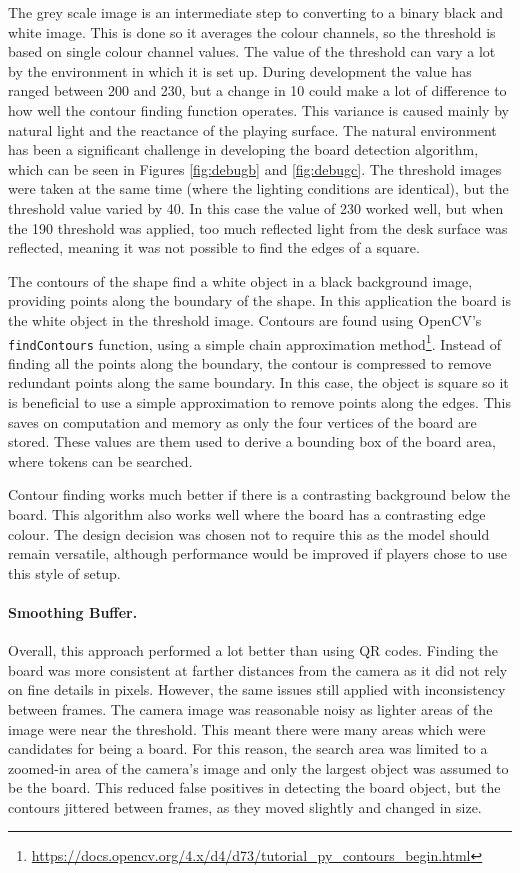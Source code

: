 \documentclass[12pt]{article}
\begin{document}
The grey scale image is an intermediate step to converting to a binary black and white image. 
This is done so it averages the colour channels, so the threshold is based on single colour channel values. 
The value of the threshold can vary a lot by the environment in which it is set up. 
During development the value has ranged between 200 and 230, but a change in 10 could make a lot of difference to how well the contour finding function operates. 
This variance is caused mainly by natural light and the reactance of the playing surface.
The natural environment has been a significant challenge in developing the board detection algorithm, which can be seen in Figures \ref{fig:debugb} and \ref{fig:debugc}.
The threshold images were taken at the same time (where the lighting conditions are identical), but the threshold value varied by 40.
In this case the value of 230 worked well, but when the 190 threshold was applied, too much reflected light from the desk surface was reflected, meaning it was not possible to find the edges of a square. 

The contours of the shape find a white object in a black background image, providing points along the boundary of the shape. 
In this application the board is the white object in the threshold image. 
Contours are found using OpenCV's \texttt{findContours} function, using a simple chain approximation method\footnote{\url{https://docs.opencv.org/4.x/d4/d73/tutorial_py_contours_begin.html}}. 
Instead of finding all the points along the boundary, the contour is compressed to remove redundant points along the same boundary. 
In this case, the object is square so it is beneficial to use a simple approximation to remove points along the edges. 
This saves on computation and memory as only the four vertices of the board are stored. 
These values are them used to derive a bounding box of the board area, where tokens can be searched.

Contour finding works much better if there is a contrasting background below the board. 
This algorithm also works well where the board has a contrasting edge colour. 
The design decision was chosen not to require this as the model should remain versatile, although performance would be improved if players chose to use this style of setup. 

\paragraph{Smoothing Buffer.} Overall, this approach performed a lot better than using QR codes. 
Finding the board was more consistent at farther distances from the camera as it did not rely on fine details in pixels. 
However, the same issues still applied with inconsistency between frames. 
The camera image was reasonable noisy as lighter areas of the image were near the threshold. 
This meant there were many areas which were candidates for being a board. 
For this reason, the search area was limited to a zoomed-in area of the camera's image and only the largest object was assumed to be the board. 
This reduced false positives in detecting the board object, but the contours jittered between frames, as they moved slightly and changed in size. 
\end{document}
